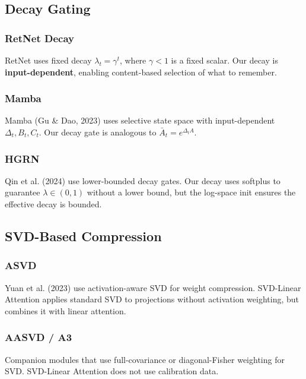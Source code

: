 \subsection{Decay Gating}

\subsubsection{RetNet Decay}

RetNet uses fixed decay $\lambda_t = \gamma^{t}$, where $\gamma < 1$ is a 
fixed scalar. Our decay is \textbf{input-dependent}, enabling content-based 
selection of what to remember.

\subsubsection{Mamba}

Mamba (Gu \& Dao, 2023) uses selective state space with input-dependent 
$\Delta_t, B_t, C_t$. Our decay gate is analogous to $\bar{A}_t = e^{\Delta_t A}$.

\subsubsection{HGRN}

Qin et al. (2024) use lower-bounded decay gates. Our decay uses softplus 
to guarantee $\lambda \in (0, 1)$ without a lower bound, but the log-space 
init ensures the effective decay is bounded.

\subsection{SVD-Based Compression}

\subsubsection{ASVD}

Yuan et al. (2023) use activation-aware SVD for weight compression. 
SVD-Linear Attention applies standard SVD to projections without 
activation weighting, but combines it with linear attention.

\subsubsection{AASVD / A3}

Companion modules that use full-covariance or diagonal-Fisher weighting 
for SVD. SVD-Linear Attention does not use calibration data.

